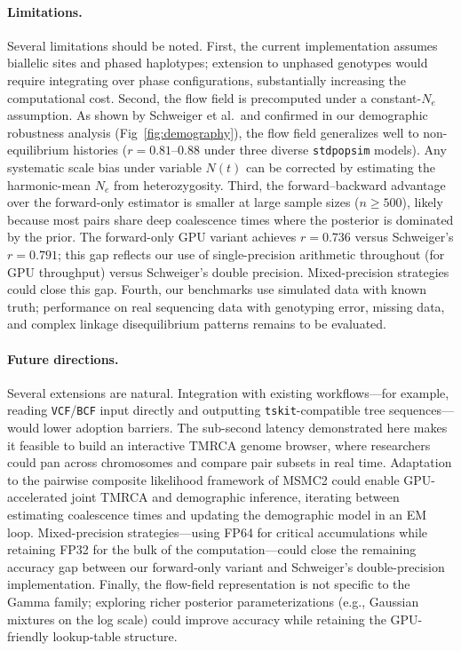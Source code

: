 \documentclass[10pt,letterpaper]{article}
\begin{document}
\paragraph{Limitations.}
Several limitations should be noted.
First, the current implementation assumes biallelic sites and phased haplotypes; extension to unphased genotypes would require integrating over phase configurations, substantially increasing the computational cost.
Second, the flow field is precomputed under a constant-$N_e$ assumption.
As shown by Schweiger et al.\ and confirmed in our demographic robustness analysis (Fig~\ref{fig:demography}), the flow field generalizes well to non-equilibrium histories ($r = 0.81$--$0.88$ under three diverse \texttt{stdpopsim} models).
Any systematic scale bias under variable $N(t)$ can be corrected by estimating the harmonic-mean $N_e$ from heterozygosity.
Third, the forward--backward advantage over the forward-only estimator is smaller at large sample sizes ($n \geq 500$), likely because most pairs share deep coalescence times where the posterior is dominated by the prior.
The forward-only GPU variant achieves $r=0.736$ versus Schweiger's $r=0.791$; this gap reflects our use of single-precision arithmetic throughout (for GPU throughput) versus Schweiger's double precision.
Mixed-precision strategies could close this gap.
Fourth, our benchmarks use simulated data with known truth; performance on real sequencing data with genotyping error, missing data, and complex linkage disequilibrium patterns remains to be evaluated.

\paragraph{Future directions.}
Several extensions are natural.
Integration with existing workflows---for example, reading \texttt{VCF}/\texttt{BCF} input directly and outputting \texttt{tskit}-compatible tree sequences---would lower adoption barriers.
The sub-second latency demonstrated here makes it feasible to build an interactive TMRCA genome browser, where researchers could pan across chromosomes and compare pair subsets in real time.
Adaptation to the pairwise composite likelihood framework of MSMC2 \cite{Schiffels2014} could enable GPU-accelerated joint TMRCA and demographic inference, iterating between estimating coalescence times and updating the demographic model in an EM loop.
Mixed-precision strategies---using FP64 for critical accumulations while retaining FP32 for the bulk of the computation---could close the remaining accuracy gap between our forward-only variant and Schweiger's double-precision implementation.
Finally, the flow-field representation is not specific to the Gamma family; exploring richer posterior parameterizations (e.g., Gaussian mixtures on the log scale) could improve accuracy while retaining the GPU-friendly lookup-table structure.
\end{document}
